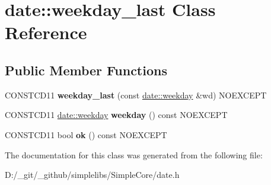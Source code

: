 \hypertarget{classdate_1_1weekday__last}{}\section{date\+::weekday\+\_\+last Class Reference}
\label{classdate_1_1weekday__last}
\subsection*{Public Member Functions}
\begin{DoxyCompactItemize}
\item 
\mbox{\label{classdate_1_1weekday__last_ad9e1e53786e471b2aba2ea086c47b089}} 
C\+O\+N\+S\+T\+C\+D11 {\bfseries weekday\+\_\+last} (const \mbox{\hyperlink{classdate_1_1weekday}{date\+::weekday}} \&wd) N\+O\+E\+X\+C\+E\+PT
\item 
\mbox{\label{classdate_1_1weekday__last_af4e5e91f1cb790211be795acde4957d4}} 
C\+O\+N\+S\+T\+C\+D11 \mbox{\hyperlink{classdate_1_1weekday}{date\+::weekday}} {\bfseries weekday} () const N\+O\+E\+X\+C\+E\+PT
\item 
\mbox{\label{classdate_1_1weekday__last_a09ff0fdc5388ff6332de5ee1d8b29e8c}} 
C\+O\+N\+S\+T\+C\+D11 bool {\bfseries ok} () const N\+O\+E\+X\+C\+E\+PT
\end{DoxyCompactItemize}


The documentation for this class was generated from the following file\+:\begin{DoxyCompactItemize}
\item 
D\+:/\+\_\+git/\+\_\+github/simplelibs/\+Simple\+Core/date.\+h\end{DoxyCompactItemize}
